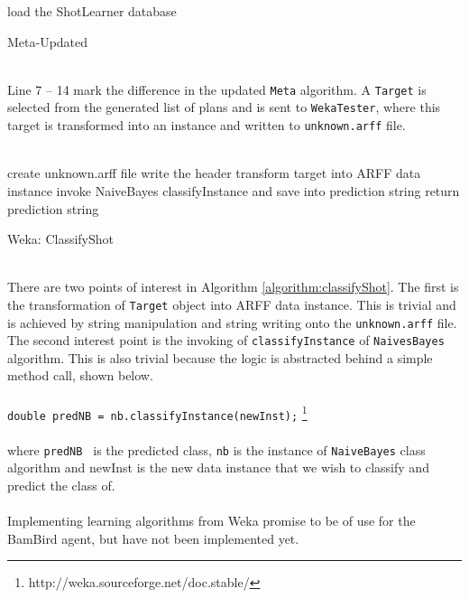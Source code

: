 \begin{algorithm}[H]
	\SetAlgoLined
	load the ShotLearner database\;
	\caption{Meta-Updated} \label{algorithm:metaUpdated}
\end{algorithm}
\ \\
Line 7 – 14 mark the difference in the updated \texttt{Meta} algorithm. A \texttt{Target} is selected from the generated list of plans and is sent to \texttt{WekaTester}, where this target is transformed into an instance and written to \texttt{unknown.arff} file.
\ \\
\ \\
\begin{algorithm}[H]
	\SetAlgoLined
	create unknown.arff file\;
	write the header\;
	transform target into ARFF data instance\;
	invoke NaiveBayes classifyInstance and save into prediction string\;
	return prediction string\;
	
	\caption{Weka: ClassifyShot}\label{algorithm:classifyShot}
\end{algorithm}
\ \\

There are two points of interest in Algorithm \ref{algorithm:classifyShot}. The first is the transformation of \texttt{Target} object into ARFF data instance. This is trivial and is achieved by string manipulation and string writing onto the \texttt{unknown.arff} file. The second interest point is the invoking of \texttt{classifyInstance} of \texttt{NaivesBayes} algorithm. This is also trivial because the logic is abstracted behind a simple method call, shown below.
\ \\
\ \\
\texttt{double predNB = nb.classifyInstance(newInst);} \footnote{http://weka.sourceforge.net/doc.stable/}
\ \\
\ \\
where \texttt{predNB } is the predicted class, \texttt{nb} is the instance of \texttt{NaiveBayes} class algorithm and newInst
is the new data instance that we wish to classify and predict the class of.
\ \\
\ \\
Implementing learning algorithms from Weka promise to be of use for the BamBird agent, but have not been implemented yet.
